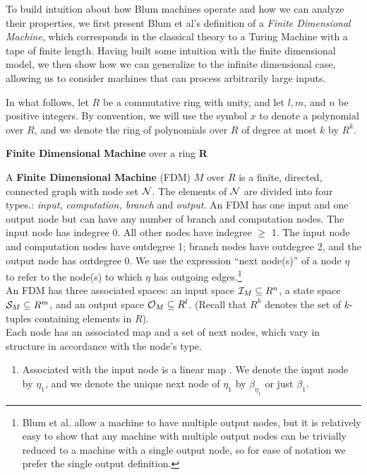 To build intuition about how Blum machines operate and how we can
analyze their properties, we first present Blum et al's definition of
a \emph{Finite Dimensional Machine}, which corresponds in the
classical theory to a Turing Machine with a tape of finite length.
Having built some intuition with the finite dimensional model, we then
show how we can generalize to the infinite dimensional case, allowing
us to consider machines that can process arbitrarily large inputs.

In what follows, let $R$ be a commutative ring with unity, and let $l,
m$, and $n$ be positive integers. By convention, we will use the
symbol $x$ to denote a polynomial over $R$, and we denote the ring of
polynomials over $R$ of degree at most $k$ by $R^k$.\\

\begin{definition}{\textbf{Finite Dimensional Machine} over a ring
    \textbf{R}}
  
  A \textbf{Finite Dimensional Machine} (FDM) $M$ over $R$ is a
  finite, directed, connected graph with node set $\mathcal{N}$.  The
  elements of $\mathcal{N}$ are divided into four types.: \emph{input,
    computation, branch} and \emph{output}.  An FDM has one input and
  one output node but can have any number of branch and computation
  nodes. The input node has indegree 0.  All other nodes have indegree
  $\geq$ 1. The input node and computation nodes have outdegree 1;
  branch nodes have outdegree 2, and the output node has outdegree 0.
  We use the expression ``next node(s)'' of a node $\eta$ to refer to
  the node(s) to which $\eta$ has outgoing edges.\footnote{Blum et
    al. allow a machine to have multiple output nodes, but it is
    relatively easy to show that any machine with multiple output
    nodes can be trivially reduced to a machine with a single output
    node, so for ease of notation we
    prefer the single output definition.}\\
  
  An FDM has three associated spaces: an input space $\mathcal{I}_M
  \subseteq R^n$, a state space $\mathcal{S}_M \subseteq R^m$, and an
  output space $\mathcal{O}_M \subseteq R^l$.  (Recall that $R^k$
  denotes the set of $k$-tuples containing elements in $R$).\\

  Each node has an associated map and a set of next nodes, which vary
  in structure in accordance with the node's type.

  \begin{enumerate}
  \item Associated with the input node is a linear map
    . We denote the input node
    by $\eta_1$, and we denote the unique next node of $\eta_1$ by
    $\beta_{\eta_1}$ or just $\beta_1$.
    

\end{enumerate}
\end{definition}
